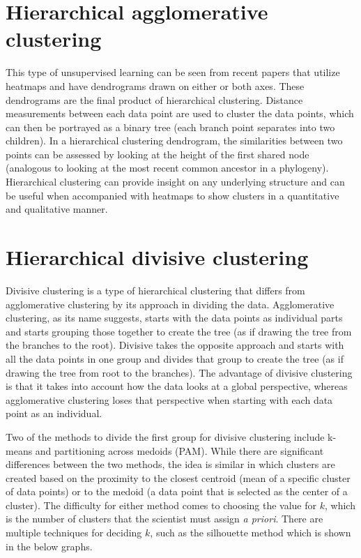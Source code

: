 \documentclass[12pt,openany]{book}
\begin{document}
\section{Hierarchical agglomerative
clustering}\label{hierarchical-agglomerative-clustering}

This type of unsupervised learning can be seen from recent papers that
utilize heatmaps and have dendrograms drawn on either or both axes.
These dendrograms are the final product of hierarchical clustering.
Distance measurements between each data point are used to cluster the
data points, which can then be portrayed as a binary tree (each branch
point separates into two children). In a hierarchical clustering
dendrogram, the similarities between two points can be assessed by
looking at the height of the first shared node (analogous to looking at
the most recent common ancestor in a phylogeny). Hierarchical clustering
can provide insight on any underlying structure and can be useful when
accompanied with heatmaps to show clusters in a quantitative and
qualitative manner.

\section{Hierarchical divisive
clustering}\label{hierarchical-divisive-clustering}

Divisive clustering is a type of hierarchical clustering that differs
from agglomerative clustering by its approach in dividing the data.
Agglomerative clustering, as its name suggests, starts with the data
points as individual parts and starts grouping those together to create
the tree (as if drawing the tree from the branches to the root).
Divisive takes the opposite approach and starts with all the data points
in one group and divides that group to create the tree (as if drawing
the tree from root to the branches). The advantage of divisive
clustering is that it takes into account how the data looks at a global
perspective, whereas agglomerative clustering loses that perspective
when starting with each data point as an individual.

Two of the methods to divide the first group for divisive clustering
include k-means and partitioning across medoids (PAM). While there are
significant differences between the two methods, the idea is similar in
which clusters are created based on the proximity to the closest
centroid (mean of a specific cluster of data points) or to the medoid (a
data point that is selected as the center of a cluster). The difficulty
for either method comes to choosing the value for \(k\), which is the
number of clusters that the scientist must assign \emph{a priori}. There
are multiple techniques for deciding \(k\), such as the silhouette
method which is shown in the below graphs.
\end{document}
